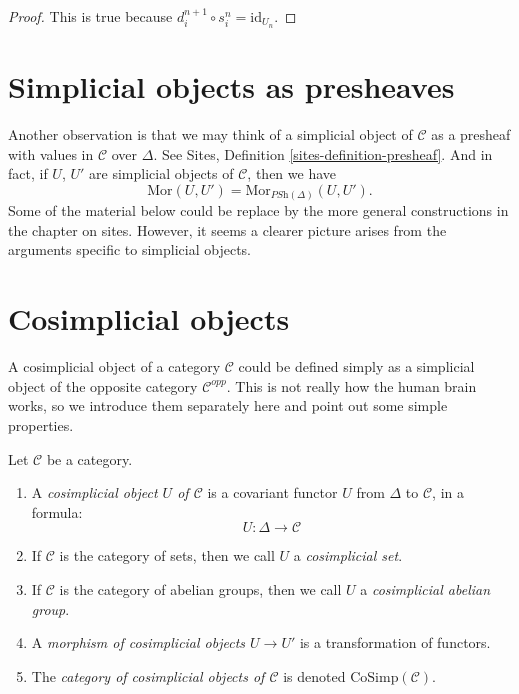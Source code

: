 \begin{proof}
This is true because $d_i^{n + 1} \circ s^n_i = \text{id}_{U_n}$.
\end{proof}

\section{Simplicial objects as presheaves}
\label{section-simplicial-presheaves}

\noindent
Another observation is that we may think of a simplicial
object of $\mathcal{C}$ as a presheaf with values in $\mathcal{C}$
over $\Delta$. See
Sites, Definition \ref{sites-definition-presheaf}.
And in fact, if $U$, $U'$ are simplicial objects
of $\mathcal{C}$, then we have
\begin{equation}
\label{equation-simplicial-set-presheaf}
\text{Mor}(U, U') = \text{Mor}_{\textit{PSh}(\Delta)}(U, U').
\end{equation}
Some of the material below could be replace by the more
general constructions in the chapter on sites.
However, it seems a clearer picture arises from the
arguments specific to simplicial objects.
















\section{Cosimplicial objects}
\label{section-cosimplicial-object}

\noindent
A cosimplicial object of a category $\mathcal{C}$ could
be defined simply as a simplicial object of the
opposite category $\mathcal{C}^{opp}$. This is not
really how the human brain works, so we introduce
them separately here and point out some simple
properties.

\begin{definition}
\label{definition-cosimplicial-object}
Let $\mathcal{C}$ be a category.
\begin{enumerate}
\item A {\it cosimplicial object $U$ of $\mathcal{C}$}
is a covariant functor $U$ from $\Delta$ to
$\mathcal{C}$, in a formula:
$$
U : \Delta \longrightarrow \mathcal{C}
$$
\item If $\mathcal{C}$ is the category of sets, then we call
$U$ a {\it cosimplicial set}.
\item If $\mathcal{C}$ is the category of abelian groups,
then we call $U$ a {\it cosimplicial abelian group}.
\item A {\it morphism of cosimplicial objects $U \to U'$}
is a transformation of functors.
\item The {\it category of cosimplicial objects of $\mathcal{C}$}
is denoted $\text{CoSimp}(\mathcal{C})$.
\end{enumerate}
\end{definition}

